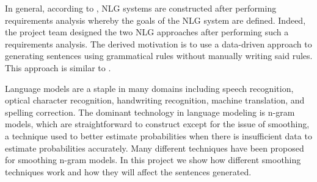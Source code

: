 \documentclass[ai15_group61_report.tex]{subfiles}
\begin{document}
In general, according to \cite{Reiter:2000:BNL:331955}, NLG systems are constructed after performing requirements analysis whereby the goals of the NLG system are defined. Indeed, the project team designed the two NLG approaches after performing such a requirements analysis. The derived motivation is to use a data-driven approach to generating sentences using grammatical rules without manually writing said rules. This approach is similar to \cite{Ratnaparkhi00}.

Language models are a staple in many domains including speech recognition, optical character recognition, handwriting recognition, machine translation, and spelling correction. The dominant technology in language modeling is n-gram models, which are straightforward to construct except for the issue of smoothing, a technique used to better estimate probabilities when there is insufficient data to estimate probabilities accurately\cite{chen-smoothing}. Many different techniques have been proposed for smoothing n-gram models. In this project we show how different smoothing techniques work and how they will affect the sentences generated.
\end{document}
